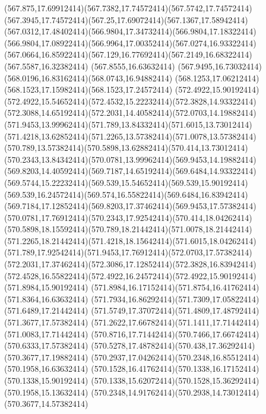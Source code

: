 {{	\curveto(567.875,17.69912414)(567.7382,17.74572414)(567.5742,17.74572414)
	\curveto(567.3945,17.74572414)(567.25,17.69072414)(567.1367,17.58942414)
	\curveto(567.0312,17.48402414)(566.9804,17.34732414)(566.9804,17.18322414)
	\curveto(566.9804,17.08922414)(566.9964,17.00352414)(567.0274,16.93322414)
	\curveto(567.0664,16.85922414)(567.129,16.77692414)(567.2149,16.68322414)
	\lineto(567.5587,16.32382414)
	\lineto(567.8555,16.63632414)
	\curveto(567.9495,16.73032414)(568.0196,16.83162414)(568.0743,16.94882414)
	\curveto(568.1253,17.06212414)(568.1523,17.15982414)(568.1523,17.24572414)
	\closepath
	\moveto(572.4922,15.90192414)
	\curveto(572.4922,15.54652414)(572.4532,15.22232414)(572.3828,14.93322414)
	\curveto(572.3088,14.65192414)(572.2031,14.40582414)(572.0703,14.19882414)
	\curveto(571.9453,13.99962414)(571.789,13.84332414)(571.6015,13.73012414)
	\curveto(571.4218,13.62852414)(571.2265,13.57382414)(571.0078,13.57382414)
	\curveto(570.789,13.57382414)(570.5898,13.62882414)(570.414,13.73012414)
	\curveto(570.2343,13.84342414)(570.0781,13.99962414)(569.9453,14.19882414)
	\curveto(569.8203,14.40592414)(569.7187,14.65192414)(569.6484,14.93322414)
	\curveto(569.5744,15.22232414)(569.539,15.54652414)(569.539,15.90192414)
	\curveto(569.539,16.24572414)(569.574,16.55822414)(569.6484,16.83942414)
	\curveto(569.7184,17.12852414)(569.8203,17.37462414)(569.9453,17.57382414)
	\curveto(570.0781,17.76912414)(570.2343,17.92542414)(570.414,18.04262414)
	\curveto(570.5898,18.15592414)(570.789,18.21442414)(571.0078,18.21442414)
	\curveto(571.2265,18.21442414)(571.4218,18.15642414)(571.6015,18.04262414)
	\curveto(571.789,17.92542414)(571.9453,17.76912414)(572.0703,17.57382414)
	\curveto(572.2031,17.37462414)(572.3086,17.12852414)(572.3828,16.83942414)
	\curveto(572.4528,16.55822414)(572.4922,16.24572414)(572.4922,15.90192414)
	\closepath
	\moveto(571.8984,15.90192414)
	\curveto(571.8984,16.17152414)(571.8754,16.41762414)(571.8364,16.63632414)
	\curveto(571.7934,16.86292414)(571.7309,17.05822414)(571.6489,17.21442414)
	\curveto(571.5749,17.37072414)(571.4809,17.48792414)(571.3677,17.57382414)
	\curveto(571.2622,17.66782414)(571.1411,17.71442414)(571.0083,17.71442414)
	\curveto(570.8716,17.71442414)(570.7466,17.66742414)(570.6333,17.57382414)
	\curveto(570.5278,17.48782414)(570.438,17.36292414)(570.3677,17.19882414)
	\curveto(570.2937,17.04262414)(570.2348,16.85512414)(570.1958,16.63632414)
	\curveto(570.1528,16.41762414)(570.1338,16.17152414)(570.1338,15.90192414)
	\curveto(570.1338,15.62072414)(570.1528,15.36292414)(570.1958,15.13632414)
	\curveto(570.2348,14.91762414)(570.2938,14.73012414)(570.3677,14.57382414)
}}
